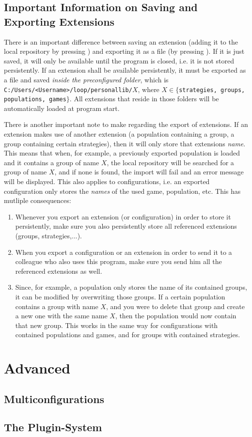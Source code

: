 \documentclass[parskip=full,11pt]{scrartcl}
\newlength\myheight
\newlength\mydepth
\newcommand*\inlinegraphics[1]{%
  \settototalheight\myheight{Xygp}%
  \settodepth\mydepth{Xygp}%
  \raisebox{-1.8\mydepth}{\texttt{[image: \#1]}}%
}
\begin{document}
\subsection{Important Information on Saving and Exporting Extensions}\label{sec:export_extensions}

There is an important difference between saving an extension (adding it to the local repository by pressing \inlinegraphics{img_manual/check_button.png}) and exporting it as a file (by pressing \inlinegraphics{img_manual/export_button.png}). If it is just saved, it will only be available until the program is closed, i.e. it is not stored persistently. If an extension shall be available persistently, it must be exported as a file and saved \textit{inside the preconfigured folder}, which is \texttt{C:/Users/<Username>/loop/personallib/\(X\)}, where \(X \in \{\)\texttt{strategies, groups, populations, games}\(\}\). All extensions that reside in those folders will be automatically loaded at program start.

There is another important note to make regarding the export of extensions. If an extension makes use of another extension (a population containing a group, a group containing certain strategies), then it will only store that extensions \textit{name}. This means that when, for example, a previously exported population is loaded and it contains a group of name \(X\), the local repository will be searched for a group of name \(X\), and if none is found, the import will fail and an error message will be displayed. This also applies to configurations, i.e. an exported configuration only stores the \textit{names} of the used game, population, etc. This has mutliple consequences:
\begin{enumerate}
\item Whenever you export an extension (or configuration) in order to store it persistently, make sure you also persistently store all referenced extensions (groups, strategies,...).
\item When you export a configuration or an extension in order to send it to a colleague who also uses this program, make sure you send him all the referenced extensions as well.
\item Since, for example, a population only stores the name of its contained groups, it can be modified by overwriting those groups. If a certain population contains a group with name \(X\), and you were to delete that group and create a new one with the same name \(X\), then the population would now contain that new group. This works in the same way for configurations with contained populations and games, and for groups with contained strategies.
\end{enumerate}

\section{Advanced}

\subsection{Multiconfigurations}

\subsection{The Plugin-System}
\end{document}
